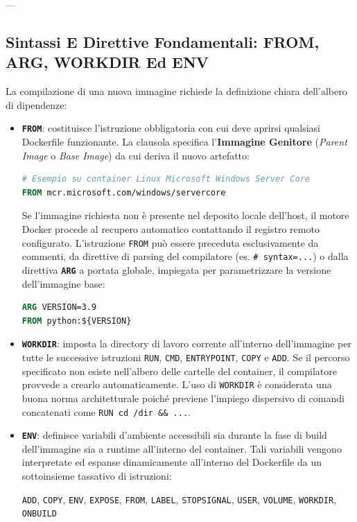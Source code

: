 \documentclass[11pt, a4paper]{article}
\begin{document}
---

\subsection{Sintassi E Direttive Fondamentali: FROM, ARG, WORKDIR Ed ENV}

La compilazione di una nuova immagine richiede la definizione chiara dell'albero di dipendenze:
\begin{itemize}
    \item \textbf{\texttt{FROM}}: costituisce l'istruzione obbligatoria con cui deve aprirsi qualsiasi Dockerfile funzionante. La clausola specifica l'\textbf{Immagine Genitore} (\emph{Parent Image} o \emph{Base Image}) da cui deriva il nuovo artefatto:
\begin{lstlisting}[language=dockerfile]
# Esempio su container Linux Microsoft Windows Server Core
FROM mcr.microsoft.com/windows/servercore
\end{lstlisting}
    Se l'immagine richiesta non è presente nel deposito locale dell'host, il motore Docker procede al recupero automatico contattando il registro remoto configurato. L'istruzione \texttt{FROM} può essere preceduta esclusivamente da commenti, da direttive di parsing del compilatore (es. \texttt{\# syntax=...}) o dalla direttiva \textbf{\texttt{ARG}} a portata globale, impiegata per parametrizzare la versione dell'immagine base:
\begin{lstlisting}[language=dockerfile]
ARG VERSION=3.9
FROM python:${VERSION}
\end{lstlisting}
    \item \textbf{\texttt{WORKDIR}}: imposta la directory di lavoro corrente all'interno dell'immagine per tutte le successive istruzioni \texttt{RUN}, \texttt{CMD}, \texttt{ENTRYPOINT}, \texttt{COPY} e \texttt{ADD}. Se il percorso specificato non esiste nell'albero delle cartelle del container, il compilatore provvede a crearlo automaticamente. L'uso di \texttt{WORKDIR} è considerata una buona norma architetturale poiché previene l'impiego dispersivo di comandi concatenati come \texttt{RUN cd /dir \&\& ...}.
    \item \textbf{\texttt{ENV}}: definisce variabili d'ambiente accessibili sia durante la fase di build dell'immagine sia a runtime all'interno del container. Tali variabili vengono interpretate ed espanse dinamicamente all'interno del Dockerfile da un sottoinsieme tassativo di istruzioni:
    \begin{center}
        \texttt{ADD}, \texttt{COPY}, \texttt{ENV}, \texttt{EXPOSE}, \texttt{FROM}, \texttt{LABEL}, \texttt{STOPSIGNAL}, \texttt{USER}, \texttt{VOLUME}, \texttt{WORKDIR}, \texttt{ONBUILD}
    \end{center}
\end{itemize}
\end{document}
